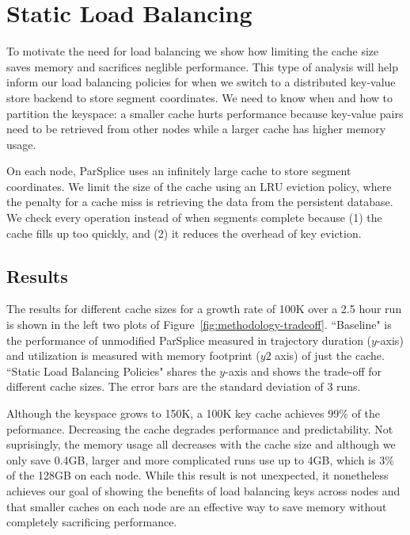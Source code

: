 \section{Static Load Balancing}
\label{sec:static-load-balancing}

To motivate the need for load balancing we show how limiting the cache size
saves memory and sacrifices neglible performance. This type of analysis will
help inform our load balancing policies for when we switch to a distributed
key-value store backend to store segment coordinates.  We need to know when and
how to partition the keyspace: a smaller cache hurts performance because
key-value pairs need to be retrieved from other nodes while a larger cache has
higher memory usage. 

On each node, ParSplice uses an infinitely large cache to store segment
coordinates. We limit the size of the cache using an LRU eviction policy, where
the penalty for a cache miss is retrieving the data from the persistent
database.  We check every operation instead of when segments complete because
(1) the cache fills up too quickly, and (2) it reduces the overhead of key
eviction.

\subsection*{Results}
The results for different cache sizes for a growth rate of 100K over a 2.5 hour
run is shown in the left two plots of Figure~\ref{fig:methodology-tradeoff}.
``Baseline" is the performance of unmodified ParSplice  measured in trajectory
duration (\(y\)-axis) and utilization is measured with memory footprint (\(y2\)
axis) of just the cache.  ``Static Load Balancing Policies" shares the
\(y\)-axis and shows the trade-off for different cache sizes. The error bars
are the standard deviation of 3 runs. 

Although the keyspace grows to 150K, a 100K key cache achieves 99\% of the
peformance. Decreasing the cache degrades performance and predictability.  Not
suprisingly, the memory usage all decreases with the cache size and although we
only save 0.4GB, larger and more complicated runs use up to 4GB, which is 3\%
of the 128GB on each node.  While this result is not unexpected, it nonetheless
achieves our goal of showing the benefits of load balancing keys across nodes
and that smaller caches on each node are an effective way to save memory
without completely sacrificing performance.

